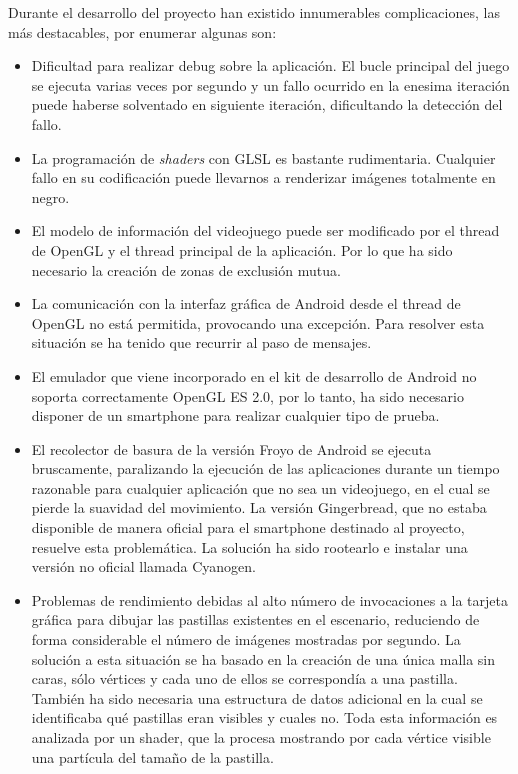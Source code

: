 Durante el desarrollo del proyecto han existido innumerables complicaciones, las más destacables, por enumerar algunas son:
\begin{itemize}
\item Dificultad para realizar debug sobre la aplicación. El bucle principal del juego se ejecuta varias veces por segundo y un fallo ocurrido en la enesima iteración puede haberse solventado en siguiente iteración, dificultando la detección del fallo.
\item La programación de \emph{shaders} con GLSL es bastante rudimentaria. Cualquier fallo en su codificación puede llevarnos a renderizar imágenes totalmente en negro.
\item El modelo de información del videojuego puede ser modificado por el thread de OpenGL y el thread principal de la aplicación. Por lo que ha sido necesario la creación de zonas de exclusión mutua.
\item La comunicación con la interfaz gráfica de Android desde el thread de OpenGL no está permitida, provocando una excepción. Para resolver esta situación se ha tenido que recurrir al paso de mensajes.
\item El emulador que viene incorporado en el kit de desarrollo de Android no soporta correctamente OpenGL ES 2.0, por lo tanto, ha sido necesario disponer de un smartphone para realizar cualquier tipo de prueba.
\item El recolector de basura de la versión Froyo de Android se ejecuta bruscamente, paralizando la ejecución de las aplicaciones durante un tiempo razonable para cualquier aplicación que no sea un videojuego, en el cual se pierde la suavidad del movimiento. La versión Gingerbread, que no estaba disponible de manera oficial para el smartphone destinado al proyecto, resuelve esta problemática. La solución ha sido rootearlo e instalar una versión no oficial llamada Cyanogen.
\item Problemas de rendimiento debidas al alto número de invocaciones a la tarjeta gráfica para dibujar las pastillas existentes en el escenario, reduciendo de forma considerable el número de imágenes mostradas por segundo. La solución a esta situación se ha basado en la creación de una única malla sin caras, sólo vértices y cada uno de ellos se correspondía a una pastilla. También ha sido necesaria una estructura de datos adicional en la cual se identificaba qué pastillas eran visibles y cuales no. Toda esta información es analizada por un shader, que la procesa mostrando por cada vértice visible una partícula del tamaño de la pastilla.
\end{itemize}

